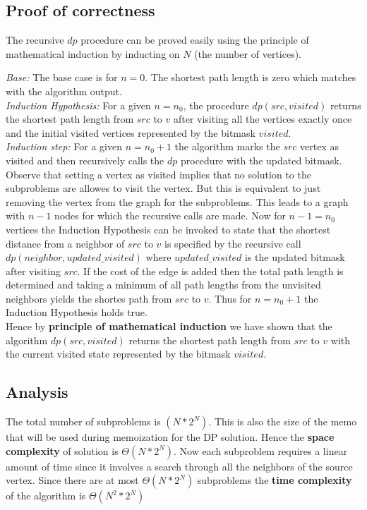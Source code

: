 \documentclass{article}
\begin{document}
\subsection{Proof of correctness}
The recursive $dp$ procedure can be proved easily using the principle of mathematical induction by inducting on $N$ (the number of vertices).

\textit{Base:}  The base case is for $n = 0$. The shortest path length is zero which matches with the algorithm output.\\

\textit{Induction Hypothesis: } For a given $n = n_0$, the procedure $dp(src, visited)$ returns the shortest path length from $src$ to $v$ after visiting all the vertices
exactly once and the initial visited vertices represented by the bitmask $visited$.\\

\textit{Induction step:} For a given $n = n_0 + 1$ the algorithm marks the $src$ vertex as visited and then recursively calls the $dp$ procedure
with the updated bitmask. Observe that setting a vertex as visited implies that no solution to the subproblems are allowes to visit the vertex.
But this is equivalent to just removing the vertex from the graph for the subproblems. This leads to a graph with $n - 1$ nodes for which the recursive calls 
are made. Now for $n - 1 = n_0$ vertices the Induction Hypothesis can be invoked to state that the shortest distance from a neighbor of $src$ to $v$ is specified
by the recursive call $dp(neighbor, updated\_visited)$ where $updated\_visited$ is the updated bitmask after visiting $src$. If the cost of the edge is added
then the total path length is determined and taking a minimum of all path lengths from the unvisited neighbors yields the shortes path from $src$ to $v$.
Thus for $n = n_0 + 1$ the Induction Hypothesis holds true.\\


Hence by \textbf{principle of mathematical induction} we have shown that the algorithm $dp(src, visited)$ returns the shortest path length from $src$ to $v$ with the current visited
state represented by the bitmask $visited$.

\subsection{Analysis}

The total number of subproblems is $(N*2^N)$. This is also the size of the memo that will be used during memoization for the DP solution.
Hence the \textbf{space complexity} of solution is $\Theta(N*2^N)$. Now each subproblem requires a linear amount of time since it involves a 
search through all the neighbors of the source vertex. Since there are at most $\Theta(N*2^N)$ subproblems the \textbf{time complexity} of the 
algorithm is $\Theta(N^2*2^N)$
\newpage
\end{document}
